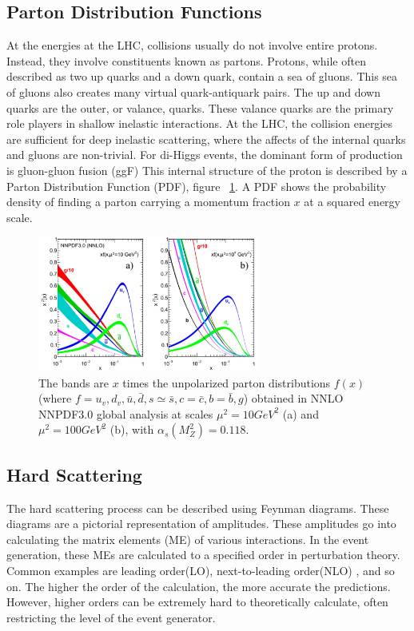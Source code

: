 \subsection{Parton Distribution Functions}
\indent At the energies at the LHC, collisions usually do not involve entire protons. Instead, they involve constituents known as partons. Protons, while often described as two up quarks and a down quark, contain a sea of gluons. This sea of gluons also creates many virtual quark-antiquark pairs. The up and down quarks are the outer, or valance, quarks. These valance quarks are the primary role players in shallow inelastic interactions. At the LHC, the collision energies are sufficient for deep inelastic scattering, where the affects of the internal quarks and gluons are non-trivial. For di-Higgs events, the dominant form of production is gluon-gluon fusion (ggF) This internal structure of the proton is described  by a Parton Distribution Function (PDF), figure ~\ref{fig:pdf}. A PDF shows the probability density of finding a parton carrying a momentum fraction ${x}$ at a squared energy scale. %
\newline

\begin{figure}[h]
\begin{center}
\includegraphics*[width=0.65\textwidth] {figures/pdf.jpg}
\caption[Parton distribution function]{The bands are ${x}$ times the unpolarized parton distributions
${f(x)}$ (where ${f = u_{v}, d_{v}, \bar{u}, \bar{d}, s \simeq{} \bar{s}, c = \bar{c}, b = \bar{b}, g}$) obtained in NNLO NNPDF3.0
global analysis at scales ${\mu^{2} = 10  GeV^{2}}$
(a) and ${\mu^{2} = 100  GeV^{2}}$ (b), with
${\alpha_{s}(M^{2}_{Z}) = 0.118}$.}
\label{fig:pdf}
\end{center}
\end{figure}

\subsection{Hard Scattering}
\indent The hard scattering process can be described using Feynman diagrams. These diagrams are a pictorial representation of amplitudes. These amplitudes go into calculating the matrix elements (ME) of various interactions. In the event generation, these MEs are calculated to a specified order in perturbation theory. Common examples are leading order(LO), next-to-leading order(NLO) , and so on. The higher the order of the calculation, the more accurate the predictions. However, higher orders can be extremely hard to theoretically calculate, often restricting the level of the event generator. \newline
